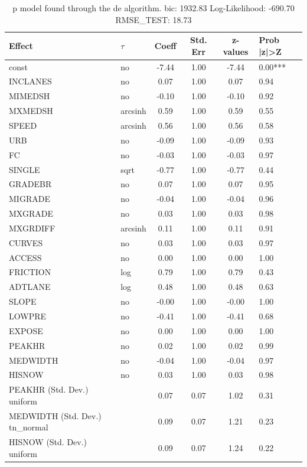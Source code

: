 \begin{table}
	\caption{p model found through the de algorithm. bic: 1932.83 Log-Likelihood: -690.70 RMSE_TEST: 18.73}
	\begin{center}
		\begin{tabular}{|l|l|c|c|c|l|}
			\hline
			Effect & $\tau$ & Coeff & Std. Err & z-values & Prob |z|>Z \\
			\hline
			const & no & -7.44 & 1.00 & -7.44 & 0.00*** \\
			\hline
			INCLANES & no & 0.07 & 1.00 & 0.07 & 0.94 \\
			\hline
			MIMEDSH & no & -0.10 & 1.00 & -0.10 & 0.92 \\
			\hline
			MXMEDSH & arcsinh & 0.59 & 1.00 & 0.59 & 0.55 \\
			\hline
			SPEED & arcsinh & 0.56 & 1.00 & 0.56 & 0.58 \\
			\hline
			URB & no & -0.09 & 1.00 & -0.09 & 0.93 \\
			\hline
			FC & no & -0.03 & 1.00 & -0.03 & 0.97 \\
			\hline
			SINGLE & sqrt & -0.77 & 1.00 & -0.77 & 0.44 \\
			\hline
			GRADEBR & no & 0.07 & 1.00 & 0.07 & 0.95 \\
			\hline
			MIGRADE & no & -0.04 & 1.00 & -0.04 & 0.96 \\
			\hline
			MXGRADE & no & 0.03 & 1.00 & 0.03 & 0.98 \\
			\hline
			MXGRDIFF & arcsinh & 0.11 & 1.00 & 0.11 & 0.91 \\
			\hline
			CURVES & no & 0.03 & 1.00 & 0.03 & 0.97 \\
			\hline
			ACCESS & no & 0.00 & 1.00 & 0.00 & 1.00 \\
			\hline
			FRICTION & log & 0.79 & 1.00 & 0.79 & 0.43 \\
			\hline
			ADTLANE & log & 0.48 & 1.00 & 0.48 & 0.63 \\
			\hline
			SLOPE & no & -0.00 & 1.00 & -0.00 & 1.00 \\
			\hline
			LOWPRE & no & -0.41 & 1.00 & -0.41 & 0.68 \\
			\hline
			EXPOSE & no & 0.00 & 1.00 & 0.00 & 1.00 \\
			\hline
			PEAKHR & no & 0.02 & 1.00 & 0.02 & 0.99 \\
			\hline
			MEDWIDTH & no & -0.04 & 1.00 & -0.04 & 0.97 \\
			\hline
			HISNOW & no & 0.03 & 1.00 & 0.03 & 0.98 \\
			\hline
			PEAKHR (Std. Dev.) uniform &  & 0.07 & 0.07 & 1.02 & 0.31 \\
			\hline
			MEDWIDTH (Std. Dev.) tn_normal &  & 0.09 & 0.07 & 1.21 & 0.23 \\
			\hline
			HISNOW (Std. Dev.) uniform &  & 0.09 & 0.07 & 1.24 & 0.22 \\
			\hline
		\end{tabular}
	\end{center}
\end{table}